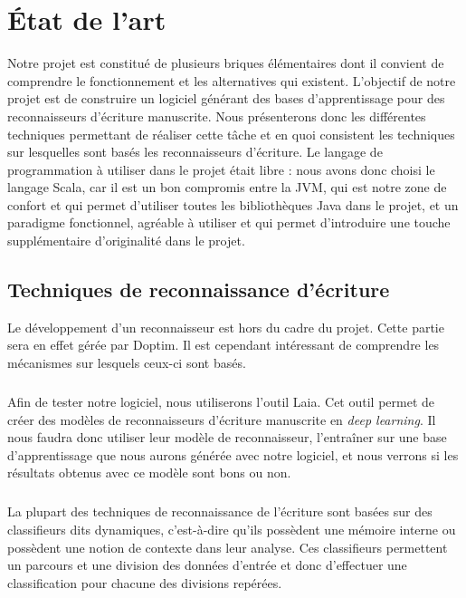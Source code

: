 \chapter{État de l'art}

Notre projet est constitué de plusieurs briques élémentaires dont il convient de comprendre
le fonctionnement et les alternatives qui existent. L’objectif de notre projet est de construire
un logiciel générant des bases d’apprentissage pour des reconnaisseurs d’écriture manuscrite.
Nous présenterons donc les différentes techniques permettant de réaliser cette tâche et en quoi
consistent les techniques sur lesquelles sont basés les reconnaisseurs d’écriture. Le langage de
programmation à utiliser dans le projet était libre : nous avons donc choisi le langage Scala,
car il est un bon compromis entre la JVM, qui est notre zone de confort et qui permet d'utiliser
toutes les bibliothèques Java dans le projet, et un paradigme fonctionnel, agréable à utiliser
et qui permet d'introduire une touche supplémentaire d'originalité dans le projet.

\section{Techniques de reconnaissance d'écriture}

Le développement d’un reconnaisseur est hors du cadre du projet. Cette partie sera en effet
gérée par Doptim. Il est cependant intéressant de comprendre les mécanismes sur lesquels ceux-ci
sont basés.

\paragraph{}
Afin de tester notre logiciel, nous utiliserons l’outil Laia. Cet outil permet de créer des
modèles de reconnaisseurs d’écriture manuscrite en \textit{deep learning}. Il nous faudra donc
utiliser leur modèle de reconnaisseur, l’entraîner sur une base d’apprentissage que nous aurons
générée avec notre logiciel, et nous verrons si les résultats obtenus avec ce modèle sont bons ou non. 

\paragraph{}
La plupart des techniques de reconnaissance de l'écriture sont basées sur des classifieurs
dits dynamiques, c'est-à-dire qu'ils possèdent une mémoire interne ou possèdent une notion
de contexte dans leur analyse. Ces classifieurs permettent un parcours et une division des
données d'entrée et donc d'effectuer une classification pour chacune des divisions repérées. 
		
